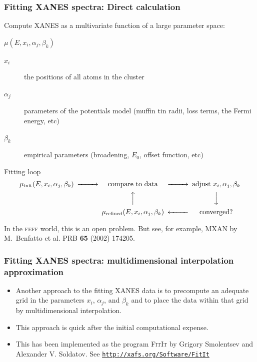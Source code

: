 \begin{frame}
  \frametitle{Fitting XANES spectra: Direct calculation}

  Compute XANES as a multivariate function of a large parameter space:
  \begin{definition}
    \centering$\mu(E,x_i,\alpha_j,\beta_k)$
  \end{definition}

  \begin{description}
    \item[$x_i$] the positions of all atoms in the cluster
    \item[$\alpha_j$]  parameters of the potentials model (muffin
      tin radii, loss terms, the Fermi energy, etc)
    \item[$\beta_k$] empirical parameters (broadening, $E_0$, offset
      function, etc)
  \end{description}


  \begin{block}{Fitting loop}
    \begin{equation*}
      \begin{CD}
        \mu_{\mathrm{init}}(E, x_i, \alpha_j, \beta_k) @>>>
        \mathrm{compare~to~data} @>>> \mathrm{adjust}~ x_i, \alpha_j, \beta_k \\
        && @AAA @VVV \\
        && \mu_{\mathrm{refined}}(E, x_i, \alpha_j, \beta_k) @<<< \mathrm{converged?}
      \end{CD}
    \end{equation*}
  \end{block}

  In the \textsc{feff} world, this is an open problem.  But see, for
  example, MXAN by M.\ Benfatto et al. PRB \textbf{65} (2002) 174205.
\end{frame}

\begin{frame}
  \frametitle{Fitting XANES spectra: multidimensional interpolation approximation}

  \begin{itemize}
  \item Another approach to the fitting XANES data is to precompute
    an adequate grid in the parameters $x_i$, $\alpha_j$, and
    $\beta_k$ and to place the data within that grid by
    multidimensional interpolation.
  \item This approach is quick after the initial computational expense.
  \item This has been implemented as the program \textsc{FitIt} by
    Grigory Smolentsev and Alexander V. Soldatov.  See
    \href{http://xafs.org/Software/FitIt}{\color{Purple4}\texttt{http://xafs.org/Software/FitIt}}
  \end{itemize}
\end{frame}


